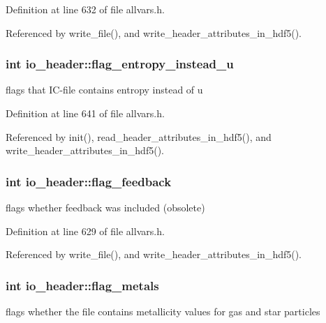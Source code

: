 Definition at line 632 of file allvars.h.



Referenced by write\_\-file(), and write\_\-header\_\-attributes\_\-in\_\-hdf5().

\hypertarget{structio__header_a448788ace72155e22d19af1c01917857}{
\subsubsection[{flag\_\-entropy\_\-instead\_\-u}]{\setlength{\rightskip}{0pt plus 5cm}int {\bf io\_\-header::flag\_\-entropy\_\-instead\_\-u}}}
\label{structio__header_a448788ace72155e22d19af1c01917857}
flags that IC-\/file contains entropy instead of u 

Definition at line 641 of file allvars.h.



Referenced by init(), read\_\-header\_\-attributes\_\-in\_\-hdf5(), and write\_\-header\_\-attributes\_\-in\_\-hdf5().

\hypertarget{structio__header_a98679063cc311c5f6184459600fa05a5}{
\subsubsection[{flag\_\-feedback}]{\setlength{\rightskip}{0pt plus 5cm}int {\bf io\_\-header::flag\_\-feedback}}}
\label{structio__header_a98679063cc311c5f6184459600fa05a5}
flags whether feedback was included (obsolete) 

Definition at line 629 of file allvars.h.



Referenced by write\_\-file(), and write\_\-header\_\-attributes\_\-in\_\-hdf5().

\hypertarget{structio__header_ac025f6c1cff1914d893ce0c7c5fd46bb}{
\subsubsection[{flag\_\-metals}]{\setlength{\rightskip}{0pt plus 5cm}int {\bf io\_\-header::flag\_\-metals}}}
\label{structio__header_ac025f6c1cff1914d893ce0c7c5fd46bb}
flags whether the file contains metallicity values for gas and star particles 

